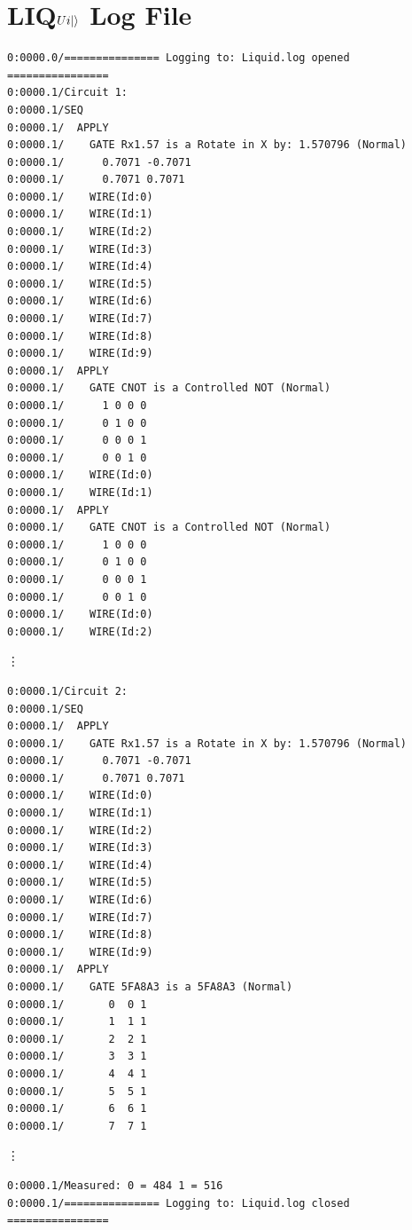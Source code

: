 \documentclass[12pt]{third-rep}
\begin{document}
\section{LIQ$Ui{\left\vert{}\right\rangle}$ Log File}
\begin{verbatim}
0:0000.0/=============== Logging to: Liquid.log opened ================
0:0000.1/Circuit 1:
0:0000.1/SEQ
0:0000.1/  APPLY
0:0000.1/    GATE Rx1.57 is a Rotate in X by: 1.570796 (Normal) 
0:0000.1/      0.7071 -0.7071 
0:0000.1/      0.7071 0.7071 
0:0000.1/    WIRE(Id:0)
0:0000.1/    WIRE(Id:1)
0:0000.1/    WIRE(Id:2)
0:0000.1/    WIRE(Id:3)
0:0000.1/    WIRE(Id:4)
0:0000.1/    WIRE(Id:5)
0:0000.1/    WIRE(Id:6)
0:0000.1/    WIRE(Id:7)
0:0000.1/    WIRE(Id:8)
0:0000.1/    WIRE(Id:9)
0:0000.1/  APPLY
0:0000.1/    GATE CNOT is a Controlled NOT (Normal) 
0:0000.1/      1 0 0 0 
0:0000.1/      0 1 0 0 
0:0000.1/      0 0 0 1 
0:0000.1/      0 0 1 0 
0:0000.1/    WIRE(Id:0)
0:0000.1/    WIRE(Id:1)
0:0000.1/  APPLY
0:0000.1/    GATE CNOT is a Controlled NOT (Normal) 
0:0000.1/      1 0 0 0 
0:0000.1/      0 1 0 0 
0:0000.1/      0 0 0 1 
0:0000.1/      0 0 1 0 
0:0000.1/    WIRE(Id:0)
0:0000.1/    WIRE(Id:2)
\end{verbatim}
\vdots
\begin{verbatim}
0:0000.1/Circuit 2:
0:0000.1/SEQ
0:0000.1/  APPLY
0:0000.1/    GATE Rx1.57 is a Rotate in X by: 1.570796 (Normal) 
0:0000.1/      0.7071 -0.7071 
0:0000.1/      0.7071 0.7071 
0:0000.1/    WIRE(Id:0)
0:0000.1/    WIRE(Id:1)
0:0000.1/    WIRE(Id:2)
0:0000.1/    WIRE(Id:3)
0:0000.1/    WIRE(Id:4)
0:0000.1/    WIRE(Id:5)
0:0000.1/    WIRE(Id:6)
0:0000.1/    WIRE(Id:7)
0:0000.1/    WIRE(Id:8)
0:0000.1/    WIRE(Id:9)
0:0000.1/  APPLY
0:0000.1/    GATE 5FA8A3 is a 5FA8A3 (Normal) 
0:0000.1/       0  0 1
0:0000.1/       1  1 1
0:0000.1/       2  2 1
0:0000.1/       3  3 1
0:0000.1/       4  4 1
0:0000.1/       5  5 1
0:0000.1/       6  6 1
0:0000.1/       7  7 1
\end{verbatim}
\vdots
\begin{verbatim}
0:0000.1/Measured: 0 = 484 1 = 516
0:0000.1/=============== Logging to: Liquid.log closed ================
\end{verbatim}
\end{document}
